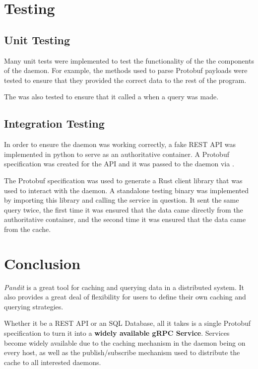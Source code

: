 \documentclass[a4paper]{article}
\begin{document}
\section{Testing}
\subsection{Unit Testing}
Many unit tests were implemented to test the functionality of the the components of the daemon.
For example, the \textit{} methods used to parse Protobuf payloads were tested to ensure that they provided the correct
data to the rest of the program.

The \textit{} was also tested to ensure that it called a \textit{} when a query was made.

\subsection{Integration Testing}
In order to ensure the daemon was working correctly, a fake REST API was implemented in python to serve as an authoritative container.
A Protobuf specification was created for the API and it was passed to the daemon via \textit{}.

The Protobuf specification was used to generate a Rust client library \cite{codegen} that was used to interact with the daemon.
A standalone testing binary was implemented by importing this library and calling the service in question.
It sent the same query twice, the first time it was ensured that the data came directly from the authoritative container, and the second time it was
ensured that the data came from the cache.

\section{Conclusion}
\textit{Pandit} is a great tool for caching and querying data in a distributed system.
It also provides a great deal of flexibility for users to define their own caching and querying strategies.

Whether it be a REST API or an SQL Database, all it takes is a single Protobuf specification \cite{protobufs} to turn it into a
\textbf{widely available gRPC \cite{grpc} Service}. Services become widely available due to the caching mechanism in the daemon being on every host,
as well as the publish/subscribe mechanism used to distribute the cache to all interested daemons.
\end{document}
